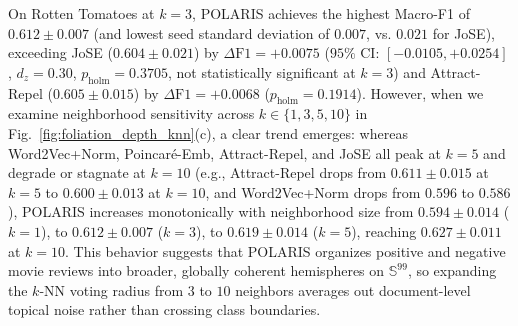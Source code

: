 \documentclass[journal]{IEEEtran}
\begin{document}
On Rotten Tomatoes at $k=3$, POLARIS achieves the highest Macro-F1 of $0.612 \pm 0.007$ (and lowest seed standard deviation of $0.007$, vs. $0.021$ for JoSE), exceeding JoSE ($0.604 \pm 0.021$) by $\Delta\text{F1} = +0.0075$ ($95\%$ CI: $[-0.0105, +0.0254]$, $d_z = 0.30$, $p_{\text{holm}} = 0.3705$, not statistically significant at $k=3$) and Attract-Repel ($0.605 \pm 0.015$) by $\Delta\text{F1} = +0.0068$ ($p_{\text{holm}} = 0.1914$). However, when we examine neighborhood sensitivity across $k \in \{1, 3, 5, 10\}$ in Fig.~\ref{fig:foliation_depth_knn}(c), a clear trend emerges: whereas Word2Vec+Norm, Poincar\'{e}-Emb, Attract-Repel, and JoSE all peak at $k=5$ and degrade or stagnate at $k=10$ (e.g., Attract-Repel drops from $0.611 \pm 0.015$ at $k=5$ to $0.600 \pm 0.013$ at $k=10$, and Word2Vec+Norm drops from $0.596$ to $0.586$), POLARIS increases monotonically with neighborhood size from $0.594 \pm 0.014$ ($k=1$), to $0.612 \pm 0.007$ ($k=3$), to $0.619 \pm 0.014$ ($k=5$), reaching $0.627 \pm 0.011$ at $k=10$. This behavior suggests that POLARIS organizes positive and negative movie reviews into broader, globally coherent hemispheres on $\mathbb{S}^{99}$, so expanding the $k$-NN voting radius from $3$ to $10$ neighbors averages out document-level topical noise rather than crossing class boundaries.
\end{document}

